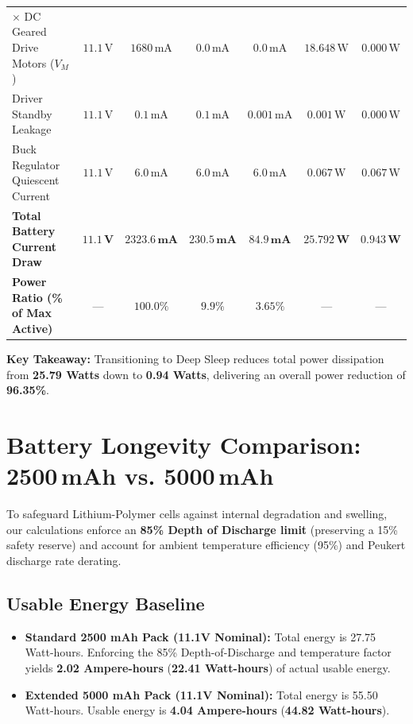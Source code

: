 \documentclass[11pt,a4paper]{article}
\begin{document}
\begin{table}[htbp]
\begin{tabularx}{\textwidth}{>{\raggedright\arraybackslash}X c c c c c c}
\midrule
4 $\times$ DC Geared Drive Motors ($V_M$) & $11.1\,\text{V}$ & $1680\,\text{mA}$ & $0.0\,\text{mA}$ & $0.0\,\text{mA}$ & $18.648\,\text{W}$ & $0.000\,\text{W}$ \\
Driver Standby Leakage & $11.1\,\text{V}$ & $0.1\,\text{mA}$ & $0.1\,\text{mA}$ & $0.001\,\text{mA}$ & $0.001\,\text{W}$ & $0.000\,\text{W}$ \\
Buck Regulator Quiescent Current & $11.1\,\text{V}$ & $6.0\,\text{mA}$ & $6.0\,\text{mA}$ & $6.0\,\text{mA}$ & $0.067\,\text{W}$ & $0.067\,\text{W}$ \\
\midrule
\midrule
\textbf{Total Battery Current Draw} & $\mathbf{11.1\,\text{V}}$ & $\mathbf{2323.6\,\text{mA}}$ & $\mathbf{230.5\,\text{mA}}$ & $\mathbf{84.9\,\text{mA}}$ & $\mathbf{25.792\,\text{W}}$ & $\mathbf{0.943\,\text{W}}$ \\
\textbf{Power Ratio (\% of Max Active)} & --- & $\mathbf{100.0\%}$ & $\mathbf{9.9\%}$ & $\mathbf{3.65\%}$ & --- & --- \\
\bottomrule
\end{tabularx}
\end{table}

\noindent\textbf{Key Takeaway:} Transitioning to Deep Sleep reduces total power dissipation from \textbf{25.79 Watts} down to \textbf{0.94 Watts}, delivering an overall power reduction of \textbf{96.35\%}.

\section{Battery Longevity Comparison: 2500\,mAh vs. 5000\,mAh}

To safeguard Lithium-Polymer cells against internal degradation and swelling, our calculations enforce an \textbf{85\% Depth of Discharge limit} (preserving a 15\% safety reserve) and account for ambient temperature efficiency (95\%) and Peukert discharge rate derating.

\subsection{Usable Energy Baseline}
\begin{itemize}[noitemsep]
    \item \textbf{Standard 2500 mAh Pack (11.1V Nominal):} Total energy is 27.75 Watt-hours. Enforcing the 85\% Depth-of-Discharge and temperature factor yields \textbf{2.02 Ampere-hours} (\textbf{22.41 Watt-hours}) of actual usable energy.
    \item \textbf{Extended 5000 mAh Pack (11.1V Nominal):} Total energy is 55.50 Watt-hours. Usable energy is \textbf{4.04 Ampere-hours} (\textbf{44.82 Watt-hours}).
\end{itemize}
\end{document}
